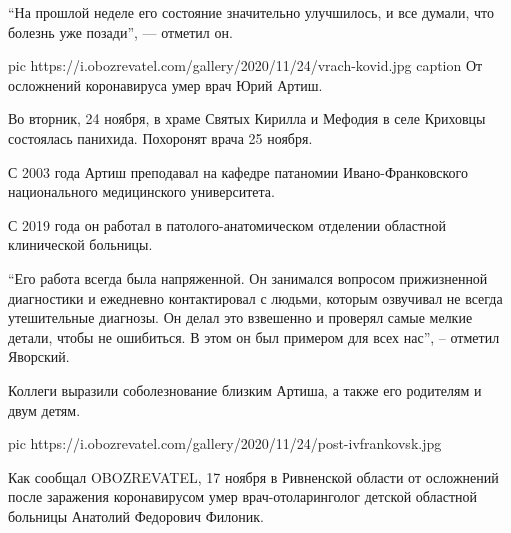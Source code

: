 \enquote{На прошлой неделе его состояние значительно улучшилось, и все думали, что
болезнь уже позади}, --- отметил он.

\ifcmt
pic https://i.obozrevatel.com/gallery/2020/11/24/vrach-kovid.jpg
caption От осложнений коронавируса умер врач Юрий Артиш.
\fi

Во вторник, 24 ноября, в храме Святых Кирилла и Мефодия в селе Криховцы
состоялась панихида. Похоронят врача 25 ноября.

С 2003 года Артиш преподавал на кафедре патаномии Ивано-Франковского
национального медицинского университета.

С 2019 года он работал в патолого-анатомическом отделении областной
клинической больницы.

\enquote{Его работа всегда была напряженной. Он занимался вопросом прижизненной
диагностики и ежедневно контактировал с людьми, которым озвучивал не
всегда утешительные диагнозы. Он делал это взвешенно и проверял самые
мелкие детали, чтобы не ошибиться. В этом он был примером для всех нас}, –
отметил Яворский.

Коллеги выразили соболезнование близким Артиша, а также его родителям и
двум детям.

\ifcmt
pic https://i.obozrevatel.com/gallery/2020/11/24/post-ivfrankovsk.jpg
\fi

Как сообщал OBOZREVATEL, 17 ноября в Ривненской области от осложнений после
заражения коронавирусом умер врач-отоларинголог детской областной больницы
Анатолий Федорович Филоник.

